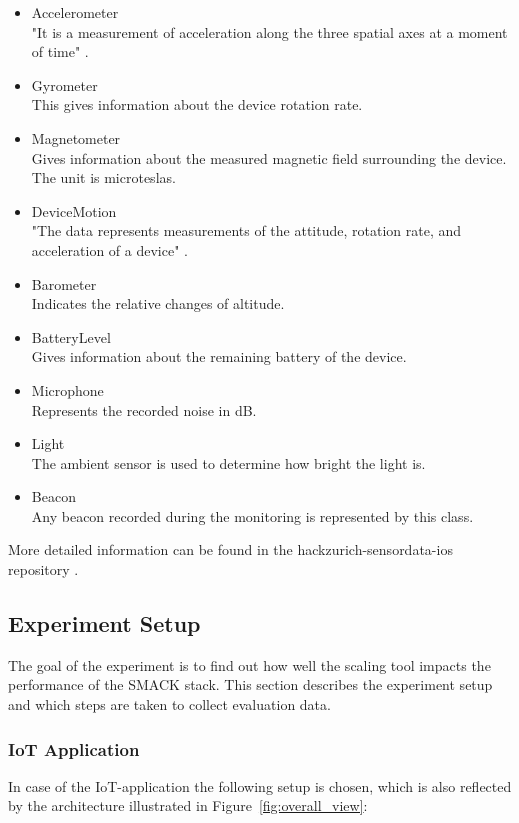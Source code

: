 \begin{itemize}
    \item Accelerometer\\
          "It is a measurement of acceleration along the three spatial axes at a moment of time" \cite{sensor-data}.
    \item Gyrometer\\
          This gives information about the device rotation rate.
    \item Magnetometer\\
          Gives information about the measured magnetic field surrounding the device. The unit is microteslas.
    \item DeviceMotion\\
          "The data represents measurements of the attitude, rotation rate, and acceleration of a device" \cite{sensor-data}.
    \item Barometer\\
          Indicates the relative changes of altitude.
    \item BatteryLevel\\
          Gives information about the remaining battery of the device.
    \item Microphone\\
          Represents the recorded noise in dB.
    \item Light\\
          The ambient sensor is used to determine how bright the light is.
    \item Beacon\\
          Any beacon recorded during the monitoring is represented by this class.
\end{itemize}



More detailed information can be found in the hackzurich-sensordata-ios repository \cite{sensor-data-repo}.


\subsection{Experiment Setup}
The goal of the experiment is to find out how well the scaling tool impacts the performance of the SMACK stack.
This section describes the experiment setup and which steps are taken to collect evaluation data.

\subsubsection{IoT Application}
In case of the IoT-application the following setup is chosen, which is also reflected by the architecture illustrated in Figure~\ref{fig:overall_view}:

